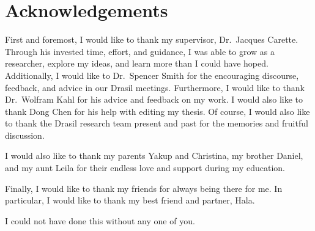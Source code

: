 \chapter{Acknowledgements}
\label{chap:acknowledgements}

First and foremost, I would like to thank my supervisor, Dr.\ Jacques Carette.
Through his invested time, effort, and guidance, I was able to grow as a
researcher, explore my ideas, and learn more than I could have hoped.
Additionally, I would like to Dr.\ Spencer Smith for the encouraging discourse,
feedback, and advice in our Drasil meetings. Furthermore, I would like to thank
Dr.\ Wolfram Kahl for his advice and feedback on my work. I would also like to
thank Dong Chen for his help with editing my thesis. Of course, I would also
like to thank the Drasil research team present and past for the memories and
fruitful discussion.

I would also like to thank my parents Yakup and Christina, my brother Daniel,
and my aunt Leila for their endless love and support during my education.

Finally, I would like to thank my friends for always being there for me. In
particular, I would like to thank my best friend and partner, Hala.

I could not have done this without any one of you.
